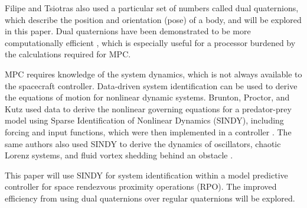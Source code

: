 \documentclass[letterpaper, preprint, paper,11pt]{AAS}	%
\begin{document}
Filipe and Tsiotras also used a particular set of numbers called dual quaternions, which describe the position and orientation (pose) of a body, and will be explored in this paper. Dual quaternions have been demonstrated to be more computationally efficient \cite{}, which is especially useful for a processor burdened by the calculations required for MPC. 

MPC requires knowledge of the system dynamics, which is not always available to the spacecraft controller. Data-driven system identification can be used to derive the equations of motion for nonlinear dynamic systems. Brunton, Proctor, and Kutz used data to derive the nonlinear governing equations for a predator-prey model using Sparse Identification of Nonlinear Dynamics (SINDY), including forcing and input functions, which were then implemented in a controller \cite{}. The same authors also used SINDY to derive the dynamics of oscillators, chaotic Lorenz systems, and fluid vortex shedding behind an obstacle \cite{}. 

This paper will use SINDY for system identification within a model predictive controller for space rendezvous proximity operations (RPO). The improved efficiency from using dual quaternions over regular quaternions will be explored. 




\end{document}
